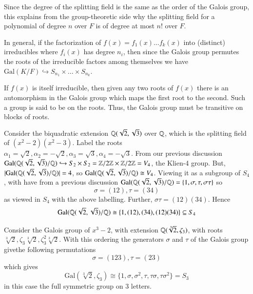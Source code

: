 \documentclass[12pt, a4paper, oneside, openright, titlepage]{book}
\begin{document}
Since the degree of the splitting field is the same as the order of the Galois group, this explains from the group-theoretic side why the splitting field for a polynomial of degree $n$ over $F$ is of degree at most $n!$ over $F$. 

In general, if the factorization of $f(x) =f_1(x)...f_k(x)$ into (distinct) irreducibles where $f_i(x)$ has degree $n_i$, then since the Galois group permutes the roots of the irreducible factors among themselves we have $\text{Gal}(K/F) \hookrightarrow S_{n_1}\times ... \times S_{n_k}$. 

If $f(x)$ is itself irreducible, then given any two roots of $f(x)$ there is an automorphism in the Galois group which maps the first root to the second. Such a group is said to be  on the roots. Thus, the Galois group must be transitive on blocks of roots.

\begin{eg}
    Consider the biquadratic extension $\mathbb Q(\sqrt{2},\sqrt{3})$ over $\mathbb Q$, which is the splitting field of $(x^2-2)(x^2-3)$. Label the roots $\alpha_1 = \sqrt{2},\alpha_2 = -\sqrt{2},\alpha_3 = \sqrt{3},\alpha_4 = -\sqrt{3}$. From our previous discussion $\text{Gal}(\mathbb Q(\sqrt{2},\sqrt{3})/\mathbb Q) \hookrightarrow S_2\times S_2 = \mathbb Z/2\mathbb Z\times \mathbb Z/2\mathbb Z = V_4$, the Klien-4 group. But, $|\text{Gal}(\mathbb Q(\sqrt{2},\sqrt{3})/\mathbb Q)| = 4$, so $\text{Gal}(\mathbb Q(\sqrt{2},\sqrt{3})/\mathbb Q)\cong V_4$. Viewing it as a subgroup of $S_4$, with have from a previous discussion $\text{Gal}(\mathbb Q(\sqrt{2},\sqrt{3})/\mathbb Q) = \{1,\sigma,\tau,\sigma\tau\}$ so \begin{equation*}
        \sigma = (12), \tau = (34)
    \end{equation*}
    as viewed in $S_4$ with the above labelling. Further, $\sigma\tau = (12)(34)$. Hence \begin{equation*}
        \text{Gal}(\mathbb Q(\sqrt{2},\sqrt{3})/\mathbb Q) \cong \{1,(12),(34),(12)(34)\} \subseteq S_4
    \end{equation*}
\end{eg}


\begin{eg}
    Consider the Galois group of $x^3 - 2$, with extension $\mathbb Q(\sqrt[3]{2},\zeta_3)$, with roots $\sqrt[3]{2},\zeta_3\sqrt[3]{2},\zeta_3^2\sqrt[3]{2}$. With this ordering the generators $\sigma$ and $\tau$ of the Galois group givethe following permutations \begin{equation*}
        \sigma = (123), \tau = (23)
    \end{equation*}
    which gives \begin{equation*}
        \text{Gal}(\sqrt[3]{2},\zeta_3) \cong \{1,\sigma,\sigma^2,\tau,\tau\sigma,\tau\sigma^2\} = S_3
    \end{equation*}
    in this case the full symmetric group on $3$ letters.
\end{eg}
\end{document}
